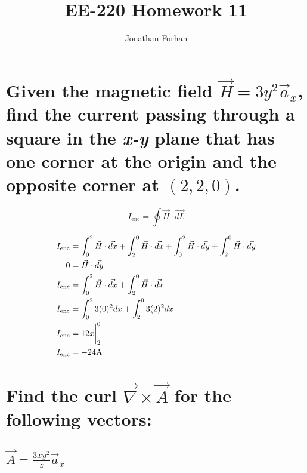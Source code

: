 \documentclass[14pt]{extarticle}
\title{EE-220 Homework 11}
\author{Jonathan Forhan}
\date{ }
\begin{document}
\maketitle

\boldmath
\section{Given the magnetic field $\vec{H}=3y^2\vec{a}_x$, find the
  current passing through a square in the \textit{x-y} plane
  that has one corner at the origin and the opposite
  corner at $(2,2,0)$.}
\unboldmath

\begin{center}
\end{center}

$$I_{\mathrm{enc}}=\oint\vec{H}\cdot\vec{dL}$$

\begin{align*}
	I_{\mathrm{enc}} & =
	\int^{2}_{0}\vec{H}\cdot\vec{dx}+
	\int^{0}_{2}\vec{H}\cdot\vec{dx}+
	\int^{2}_{0}\vec{H}\cdot\vec{dy}+
	\int^{0}_{2}\vec{H}\cdot\vec{dy}                                   \\
	0                & = \vec{H}\cdot\vec{dy}                          \\
	I_{\mathrm{enc}} & =
	\int^{2}_{0}\vec{H}\cdot\vec{dx}+ \int^{0}_{2}\vec{H}\cdot\vec{dx} \\
	I_{\mathrm{enc}} & =
	\int^{2}_{0}3(0)^2dx+ \int^{0}_{2}3(2)^2dx                         \\
	I_{\mathrm{enc}} & = 12x\bigg{|}^0_2                               \\
	I_{\mathrm{enc}} & = -24\mathrm{A}
\end{align*}

\boldmath
\section{Find the curl $\vec{\nabla}\times\vec{A}$ for the following vectors:}
\unboldmath

\boldmath
\subsection{$\vec{A}=\frac{3xy^2}{z}\vec{a}_x$}
\unboldmath
\end{document}
